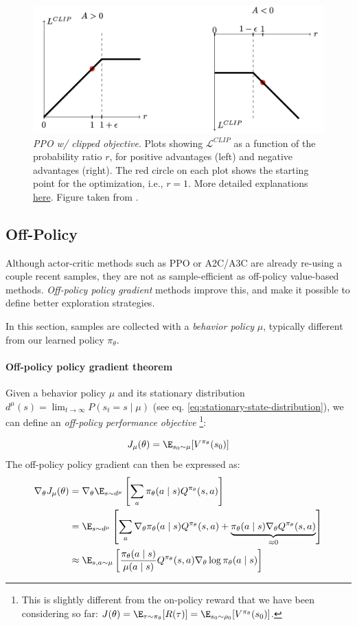 \begin{figure}
    \centering
    \includegraphics[width=0.5\linewidth]{figures/ppo-clip.png}
    \caption{\emph{PPO w/ clipped objective}. Plots showing $\mathcal{L}^{CLIP}$ as a function of the probability ratio $r$, for positive advantages (left) and negative advantages (right). The red circle on each plot shows the starting point for the optimization, i.e., $r=1$. More detailed explanations \href{https://stackoverflow.com/a/50663200}{here}. Figure taken from \cite{schulman2017proximal}.}
    \label{fig:ppo-clip}
\end{figure}

\subsection{Off-Policy}
Although actor-critic methods such as PPO or A2C/A3C are already re-using a couple recent samples, they are not as sample-efficient as off-policy value-based methods. \emph{Off-policy policy gradient} methods improve this, and make it possible to define better exploration strategies.

In this section, samples are collected with a \emph{behavior policy} $\mu$, typically different from our learned policy $\pi_\theta$.

\paragraph{Off-policy policy gradient theorem}
Given a behavior policy $\mu$ and its stationary distribution $d^\mu(s) = \lim_{t\rightarrow \infty} P(s_t = s \mid \mu)$ (see eq. \ref{eq:stationary-state-distribution}), we can define an \emph{off-policy performance objective} \footnote{
This is slightly different from the on-policy reward that we have been considering so far: $J(\theta) = \E_{\tau \sim \pi_\theta}[R(\tau)] = \E_{s_0 \sim \rho_0}[V^{\pi_\theta}(s_0)]$.
}:

\[
    J_\mu(\theta) = \E_{s_0 \sim \mu}[V^{\pi_\theta}(s_0)]
\]
The off-policy policy gradient can then be expressed as:
\begin{align}
    \nabla_\theta J_\mu(\theta)
    &= \nabla_\theta \E_{s\sim d^\mu} \left[ \sum_a \pi_\theta(a\mid s) Q^{\pi_\theta}(s,a) \right] \nonumber \\
    &= \E_{s\sim d^\mu} \left[ 
        \sum_a \nabla_\theta \pi_\theta(a\mid s) Q^{\pi_\theta}(s,a) + 
        \underbrace{\pi_\theta(a\mid s) \nabla_\theta Q^{\pi_\theta}(s,a)}_{\approx 0}
    \right] \nonumber \\
    &\approx \E_{s,a \sim \mu} \left[
        \frac{\pi_\theta(a\mid s)}{\mu(a\mid s)} Q^{\pi_\theta}(s,a) \nabla_\theta \log \pi_\theta(a\mid s)
    \right]
    \label{eq:off-policy-policy-gradient}
\end{align}

